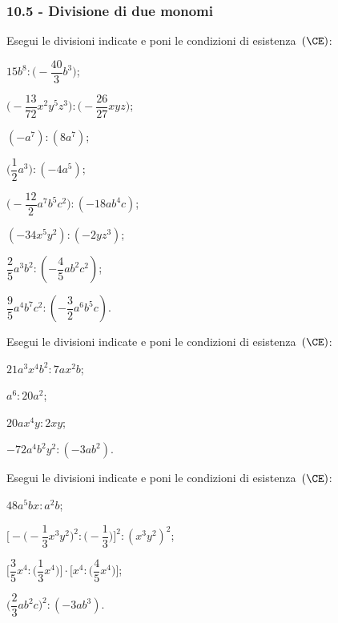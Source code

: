 \subsubsection*{10.5 - Divisione di due monomi}
\begin{esercizio}[\Ast]
 \label{ese:10.20} %
Esegui le divisioni indicate e poni le condizioni di esistenza~$(\CE)$:
\begin{multicols}{2}
\begin{enumeratea}
\spazielenx
 \item $15b^{8}:\bigg(-{\dfrac{40}{3}}b^{3}\bigg)$;
 \item $\bigg(-{\dfrac{13}{72}}x^{2}y^{5}z^{3}\bigg):\bigg(-{\dfrac{26}{27}}xyz\bigg)$;
 \item $(-a^{7}):(8a^{7})$;
 \item $\bigg(\dfrac{1}{2}a^{3}\bigg):(-4a^{5})$;
 \item $\bigg(-{\dfrac{12}{2}}a^{7}b^{5}c^{2}\bigg):(-18ab^{4}c)$;
 \item $(-34x^{5}y^{2}):(-2yz^{3})$;
 \item $\dfrac{2}{5}a^3b^2:\left(-\dfrac{4}{5}ab^2c^2\right)$;
 \item $\dfrac{9}{5}a^4b^7c^2:\left(-\dfrac{3}{2}a^6b^5c\right)$.
\end{enumeratea}
\end{multicols}
\end{esercizio}

\begin{esercizio}
 \label{ese:10.21} %
Esegui le divisioni indicate e poni le condizioni di esistenza~$(\CE)$:
\begin{multicols}{2}
\begin{enumeratea}
 \item $21a^{3}x^{4}b^{2}:7ax^{2}b$;
 \item $a^{6}:20a^{2}$;
 \item $20ax^{4}y:2xy$;
 \item $-72a^{4}b^{2}y^{2}:(-3ab^{2})$.
\end{enumeratea}
\end{multicols}
\end{esercizio}

\begin{esercizio}[\Ast]
 \label{ese:10.22} %
Esegui le divisioni indicate e poni le condizioni di esistenza~$(\CE)$:
\begin{multicols}{2}
\begin{enumeratea}
 \item $48a^{5}bx:a^{2}b$;
 \item $\Bigg[-\bigg(-{\dfrac{1}{3}}x^{3}y^{2}\bigg)^{2}:\bigg(-{\dfrac{1}{3}}\bigg)\Bigg]^{2}:(x^{3}y^{2})^{2}$;
 \item $\Bigg[\dfrac{3}{5}x^{4}:\bigg(\dfrac{1}{3}x^{4}\bigg)\Bigg]\cdot\Bigg[x^{4}:\bigg(\dfrac{4}{5}x^{4}\bigg)\Bigg]$;
 \item $\bigg(\dfrac{2}{3}ab^{2}c\bigg)^{2}:(-3ab^{3})$.
\end{enumeratea}
\end{multicols}
\end{esercizio}

